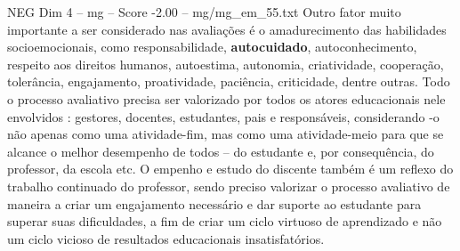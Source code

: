 \begin{textsample}{NEG Dim 4 – mg – Score -2.00 – mg/mg\_em\_55.txt}
Outro fator muito importante a ser considerado nas avaliações é o amadurecimento das habilidades socioemocionais, como responsabilidade, \textbf{autocuidado}, autoconhecimento, respeito aos direitos humanos, autoestima, autonomia, criatividade, cooperação, tolerância, engajamento, proatividade, paciência, criticidade, dentre outras.
Todo o processo avaliativo precisa ser valorizado por todos os atores educacionais nele envolvidos : gestores, docentes, estudantes, pais e responsáveis, considerando -o não apenas como uma atividade-fim, mas como uma atividade-meio para que se alcance o melhor desempenho de todos – do estudante e, por consequência, do professor, da escola etc.
O empenho e estudo do discente também é um reflexo do trabalho continuado do professor, sendo preciso valorizar o processo avaliativo de maneira a criar um engajamento necessário e dar suporte ao estudante para superar suas dificuldades, a fim de criar um ciclo virtuoso de aprendizado e não um ciclo vicioso de resultados educacionais insatisfatórios.

\end{textsample}
